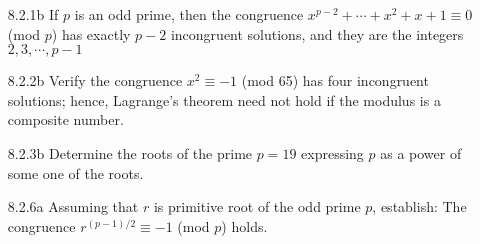 \documentclass[12pt]{article}
\begin{document}
\begin{enumerate}
	\item[8.2.1b]If $ p $ is an odd prime, then the congruence $ x^{p-2}+\cdots+x^2+x+1\equiv0 $ (mod $ p $) has exactly $ p-2 $ incongruent solutions, and they are the integers $ 2,3,\cdots,p-1 $
	
	\item[8.2.2b] Verify the congruence $ x^2\equiv-1 $ (mod 65) has four incongruent solutions; hence, Lagrange's theorem need not hold if the modulus is a composite number.
	
	\item[8.2.3b] Determine the roots of the prime $ p = 19 $ expressing $p$ as a power of some one of the roots.
	
	\item[8.2.6a] Assuming that $ r $ is primitive root of the odd prime $ p $, establish: The congruence $ r^{(p-1)/2}\equiv-1 $ (mod $ p $) holds.

\end{enumerate}
\end{document}
